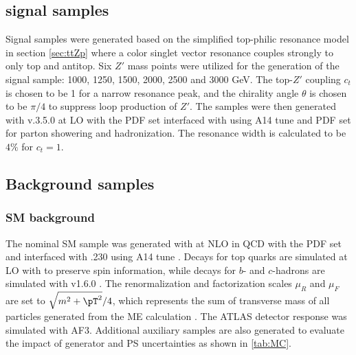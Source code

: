 \documentclass[../thesis.tex]{subfiles}
\begin{document}
\subsection{\ttZp signal samples}
Signal \ttZp samples were generated based on the simplified top-philic resonance model in section \ref{sec:ttZp} where a color singlet vector resonance couples strongly to only top and antitop. Six $Z'$ mass points were utilized for the generation of the signal sample: 1000, 1250, 1500, 2000, 2500 and 3000 GeV. The top-$Z'$ coupling $c_t$ is chosen to be 1 for a narrow resonance peak, and the chirality angle $\theta$ is chosen to be $\pi/4$ to suppress loop production of $Z'$. The samples were then generated with \mgamc v.3.5.0 \citep{Alwall:2014hca} at \acs{LO} with the \nnpdfonelo \citep{Ball:2014uwa} \acs{PDF} set interfaced with \pythia \citep{Sjostrand:2014zea} using A14 tune and \nnpdftwo \acs{PDF} set for parton showering and hadronization. The resonance width is calculated to be $4\%$ for $c_t=1$.

\subsection{Background samples}

\subsubsection*{\acs{SM} \tttt background}
The nominal \acs{SM} \tttt sample was generated with \mgamc \citep{Alwall:2014hca} at \acs{NLO} in \acs{QCD} with the \nnpdfnlo \citep{Ball:2014uwa} \acs{PDF} set and interfaced with \pythia.230 \citep{Sjostrand:2014zea} using A14 tune \citep{ATL-PHYS-PUB-2014-021}. Decays for top quarks are simulated at \acs{LO} with \madspin \citep{Frixione:2007zp, Artoisenet:2012st} to preserve spin information, while decays for $b$- and $c$-hadrons are simulated with \evtgen v1.6.0 \citep{Lange:2001uf}. The renormalization and factorization scales $\mu_R$ and $\mu_F$ are set to $\sqrt{m^2+\pT^2}/4$, which represents the sum of transverse mass of all particles generated from the \acs{ME} calculation \citep{Frederix:2017wme}. The ATLAS detector response was simulated with \acs{AF3}. Additional auxiliary \tttt samples are also generated to evaluate the impact of generator and \acs{PS} uncertainties as shown in \ref{tab:MC}.
\end{document}

